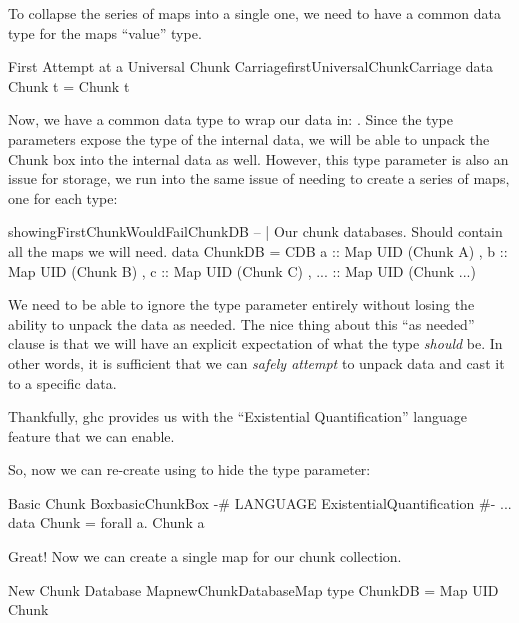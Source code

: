 To collapse the series of maps into a single one, we need to have a common data
type for the maps ``value'' type. 

\begin{pseudohaskell}{First Attempt at a Universal Chunk Carriage}{firstUniversalChunkCarriage}
data Chunk t = Chunk t
\end{pseudohaskell}

Now, we have a common data type to wrap our data in: \Chunk{}. Since the type
parameters expose the type of the internal data, we will be able to unpack the
Chunk box into the internal data as well. However, this type parameter is also
an issue for storage, we run into the same issue of needing to create a series
of maps, one for each type:

\begin{pseudohaskell}{}{showingFirstChunkWouldFailChunkDB}
-- | Our chunk databases. Should contain all the maps we will need.
data ChunkDB = CDB { a   :: Map UID (Chunk A)
                   , b   :: Map UID (Chunk B)
                   , c   :: Map UID (Chunk C)
                   , ... :: Map UID (Chunk ...)
                   }
\end{pseudohaskell}

We need to be able to ignore the type parameter entirely without losing the
ability to unpack the data as needed. The nice thing about this ``as needed''
clause is that we will have an explicit expectation of what the type
\textit{should} be. In other words, it is sufficient that we can \textit{safely
attempt} to unpack data and cast it to a specific data.

Thankfully, \acs{ghc} provides us with the ``Existential Quantification''
language feature that we can enable.

So, now we can re-create \Chunk{} using \ExistentialQuantification{} to hide the
type parameter:

\begin{pseudohaskell}{Basic Chunk Box}{basicChunkBox}
{-# LANGUAGE ExistentialQuantification #-}
...
data Chunk = forall a. Chunk a
\end{pseudohaskell}

Great! Now we can create a single map for our chunk collection.

\begin{pseudohaskell}{New Chunk Database Map}{newChunkDatabaseMap}
type ChunkDB = Map UID Chunk
\end{pseudohaskell}

